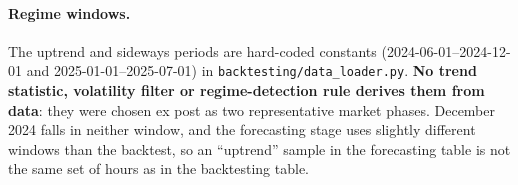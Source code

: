 \paragraph{Regime windows.}
The uptrend and sideways periods are hard-coded constants
(2024-06-01--2024-12-01 and 2025-01-01--2025-07-01) in
\texttt{backtesting/data\_loader.py}. \textbf{No trend statistic, volatility filter or
regime-detection rule derives them from data}: they were chosen ex post as two
representative market phases. December 2024 falls in neither window, and the
forecasting stage uses slightly different windows than the backtest, so an ``uptrend''
sample in the forecasting table is not the same set of hours as in the backtesting
table.
